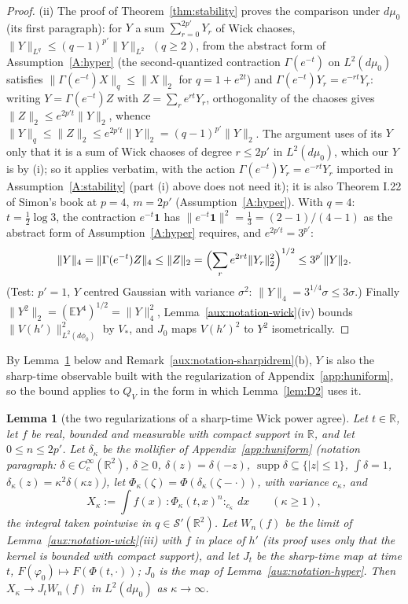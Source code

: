 \documentclass[11pt,a4paper]{article}
\theoremstyle{plain}
\theoremstyle{definition}
\theoremstyle{plain}
\newtheorem{auxlemma}{Lemma}
\theoremstyle{definition}
\newcommand{\R}{\mathbb{R}}
\newcommand{\E}{\mathbb{E}}
\DeclareMathOperator{\supp}{supp}
\newcommand{\dmu}{d\mu_0}
\newcommand{\dphi}{d\phi_0}
\begin{document}
\begin{proof}
(ii) The proof of Theorem~\ref{thm:stability} proves the comparison under $\dmu$ (its first
paragraph): for $Y$ a sum $\sum_{r=0}^{2p'}Y_r$ of Wick chaoses, $\|Y\|_{L^q}\le(q-1)^{p'}
\|Y\|_{L^2}$ $(q\ge2)$, from the abstract form of Assumption~\ref{A:hyper} (the second-quantized
contraction $\Gamma(e^{-t})$ on $L^2(d\mu_0)$ satisfies $\|\Gamma(e^{-t})X\|_q\le\|X\|_2$ for
$q=1+e^{2t}$) and $\Gamma(e^{-t})Y_r=e^{-rt}Y_r$: writing $Y=\Gamma(e^{-t})Z$ with
$Z=\sum_re^{rt}Y_r$, orthogonality of the chaoses gives $\|Z\|_2\le e^{2p't}\|Y\|_2$, whence
$\|Y\|_q\le\|Z\|_2\le e^{2p't}\|Y\|_2=(q-1)^{p'}\|Y\|_2$.  The argument uses of its $Y$ only that it is a sum of
Wick chaoses of degree $r\le2p'$ in $L^2(\dmu)$, which our $Y$ is by (i); so it applies
verbatim, with the action $\Gamma(e^{-t})Y_r=e^{-rt}Y_r$ imported in
Assumption~\ref{A:stability} (part (i) above does not need it); it is also Theorem I.22 of
Simon's book at $p=4$, $m=2p'$ (Assumption~\ref{A:hyper}).  With $q=4$: $t=\frac12\log3$, the
contraction $e^{-t}\mathbf 1$ has $\|e^{-t}\mathbf 1\|^2=\frac13=(2-1)/(4-1)$ as the abstract
form of Assumption~\ref{A:hyper} requires, and $e^{2p't}=3^{p'}$:
\[
 \|Y\|_4=\|\Gamma(e^{-t})Z\|_4\le\|Z\|_2=\Bigl(\sum_re^{2rt}\|Y_r\|_2^2\Bigr)^{1/2}\le
 3^{p'}\|Y\|_2 .
\]
(Test: $p'=1$, $Y$ centred Gaussian with variance $\sigma^2$: $\|Y\|_4=3^{1/4}\sigma\le3\sigma$.)
Finally $\|Y^2\|_2=(\E Y^4)^{1/2}=\|Y\|_4^2$, Lemma~\ref{aux:notation-wick}(iv) bounds
$\|V(h')\|_{L^2(\dphi)}^2$ by $V_*$, and $J_0$ maps $V(h')^2$ to $Y^2$ isometrically.
\end{proof}

By Lemma~\ref{aux:notation-sharpid} below and Remark~\ref{aux:notation-sharpidrem}(b), $Y$ is also
the sharp-time observable built with the regularization of Appendix~\ref{app:huniform}, so the bound applies to $Q_V$ in
the form in which Lemma~\ref{lem:D2} uses it.

\begin{auxlemma}[the two regularizations of a sharp-time Wick power agree]\label{aux:notation-sharpid}
Let $t\in\R$, let $f$ be real, bounded and measurable with compact support in $\R$, and let
$0\le n\le2p'$.  Let $\delta_\kappa$ be the mollifier of Appendix~\ref{app:huniform} (notation paragraph: $\delta\in C_c^\infty(\R^2)$, $\delta\ge0$, $\delta(z)=\delta(-z)$,
$\supp\delta\subseteq\{|z|\le1\}$, $\int\delta=1$, $\delta_\kappa(z)=\kappa^2\delta(\kappa z)$),
let $\Phi_\kappa(\zeta)=\Phi(\delta_\kappa(\zeta-\cdot))$, with variance $c_\kappa$, and
\[
 X_\kappa:=\int f(x)\,{:}\Phi_\kappa(t,x)^n{:}_{c_\kappa}\,dx\qquad(\kappa\ge1),
\]
the integral taken pointwise in $q\in\mathcal S'(\R^2)$.  Let $W_n(f)$ be the limit of
Lemma~\ref{aux:notation-wick}(iii) with $f$ in place of $h'$ (its proof uses only that the kernel
is bounded with compact support), and let $J_t$ be the sharp-time map at time $t$,
$F(\varphi_0)\mapsto F(\Phi(t,\cdot))$; $J_0$ is the map of Lemma~\ref{aux:notation-hyper}.
Then $X_\kappa\to J_tW_n(f)$ in $L^2(\dmu)$ as $\kappa\to\infty$.
\end{auxlemma}
\end{document}
